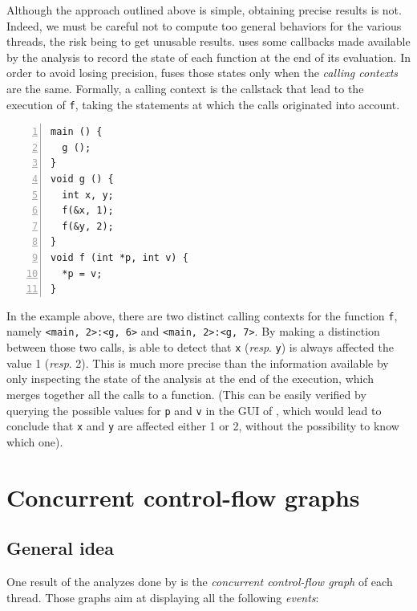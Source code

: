 \documentclass{frama-c-book}
\def\resp.{\emph{resp}.}
\begin{document}
Although the approach outlined above is simple, obtaining precise
results is not. Indeed, we must be careful not to compute too general
behaviors for the various threads, the risk being to get unusable
results. %
%
\mthread uses some callbacks made available by the \Eva analysis to
record the state of each function at the end of its evaluation.
In order to avoid losing precision, \mthread fuses
those states only when the \emph{calling contexts} are the same.
%
Formally, a calling context is the callstack that lead to
the execution of \verb+f+, taking the statements at which the
calls originated into account.
\begin{lstlisting}[numbers=left]
main () {
  g ();
}
void g () {
  int x, y;
  f(&x, 1);
  f(&y, 2);
}
void f (int *p, int v) {
  *p = v;
}
\end{lstlisting}
In the example above, there are two distinct calling contexts for the
function \verb+f+, namely \verb+<main, 2>:<g, 6>+ and
\verb+<main, 2>:<g, 7>+.  By making a distinction between those two
calls, \mthread is able to detect that \verb+x+ (\resp. \verb+y+) is
always affected the value 1 (\resp. 2). This is much more precise than
the information available by only inspecting the state of the \Eva
analysis at the end of the execution, which merges together all the calls
to a function. (This can be easily verified by querying the
possible values for \verb+p+ and \verb+v+ in the GUI of \FramaC, which
would lead to conclude that \verb+x+ and \verb+y+ are affected
either 1 or 2, without the possibility to know which one).


\section{Concurrent control-flow graphs}
\label{sec:mthread-cfg}

\subsection{General idea}

One result of the analyzes done by \mthread is the \emph{concurrent
  control-flow graph} of each thread. Those graphs aim at
displaying all the following \emph{events}:
\end{document}
